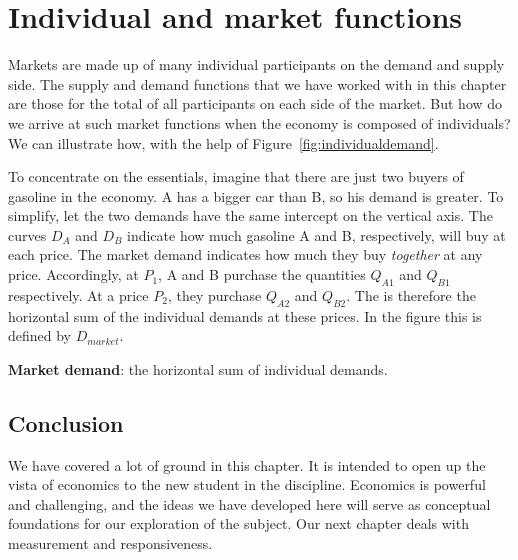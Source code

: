 \section{Individual and market functions}\label{sec:ch3sec8}

Markets are made up of many individual participants on the demand and supply side. The supply and demand functions that we have worked with in this chapter are those for the total of all participants on each side of the market. But how do we arrive at such market functions when the economy is composed of individuals? We can illustrate how, with the help of Figure~\ref{fig:individualdemand}.



To concentrate on the essentials, imagine that there are just two buyers of gasoline in the economy. A has a bigger car than B, so his demand is greater. To simplify, let the two demands have the same intercept on the vertical axis. The curves $D_A$ and $D_B$ indicate how much gasoline A and B, respectively, will buy at each price. The market demand indicates how much they buy \textit{together} at any price. Accordingly, at $P_1$, A and B purchase the quantities $Q_{A1}$ and $Q_{B1}$ respectively. At a price $P_2$, they purchase $Q_{A2}$ and $Q_{B2}$. The  is therefore the horizontal sum of the individual demands at these prices. In the figure this is defined by $D_{market}$.

\begin{DefBox}
\textbf{Market demand}: the horizontal sum of individual demands.
\end{DefBox}

\subsection*{Conclusion}

We have covered a lot of ground in this chapter. It is intended to open up the vista of economics to the new student in the discipline. Economics is powerful and challenging, and the ideas we have developed here will serve as conceptual foundations for our exploration of the subject. Our next chapter deals with measurement and responsiveness.
